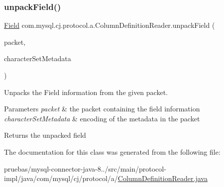 \mbox{\label{classcom_1_1mysql_1_1cj_1_1protocol_1_1a_1_1_column_definition_reader_a544a33df60bf2153e61c6c743e3aefd7}} 
\subsubsection{\texorpdfstring{unpack\+Field()}{unpackField()}}
{\footnotesize\ttfamily \mbox{\hyperlink{classcom_1_1mysql_1_1cj_1_1result_1_1_field}{Field}} com.\+mysql.\+cj.\+protocol.\+a.\+Column\+Definition\+Reader.\+unpack\+Field (\begin{DoxyParamCaption}\item[{\mbox{\hyperlink{classcom_1_1mysql_1_1cj_1_1protocol_1_1a_1_1_native_packet_payload}{Native\+Packet\+Payload}}}]{packet,  }\item[{String}]{character\+Set\+Metadata }\end{DoxyParamCaption})\hspace{0.3cm}{\ttfamily [protected]}}

Unpacks the Field information from the given packet.


\begin{DoxyParams}{Parameters}
{\em packet} & the packet containing the field information \\
\hline
{\em character\+Set\+Metadata} & encoding of the metadata in the packet\\
\hline
\end{DoxyParams}
\begin{DoxyReturn}{Returns}
the unpacked field 
\end{DoxyReturn}


The documentation for this class was generated from the following file\+:\begin{DoxyCompactItemize}
\item 
pruebas/mysql-\/connector-\/java-\/8../src/main/protocol-\/impl/java/com/mysql/cj/protocol/a/\mbox{\hyperlink{_column_definition_reader_8java}{Column\+Definition\+Reader.\+java}}\end{DoxyCompactItemize}
